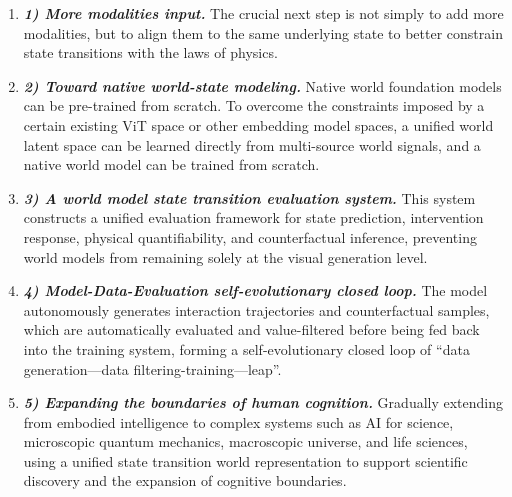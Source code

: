 \vspace{-1ex}
\begin{enumerate}[
    leftmargin=1.35em,
    itemsep=0.35em,
    topsep=0.35em,
    parsep=0em
]
    \item[] \textit{\textbf{1) More modalities input.}} The crucial next step is not simply to add more modalities, but to align them to the same underlying state to better constrain state transitions with the laws of physics.

    
    \item[] \textit{\textbf{2) Toward native world-state modeling.}} Native world foundation models can be pre-trained from scratch. To overcome the constraints imposed by a certain existing ViT space or other embedding model spaces, a unified world latent space can be learned directly from multi-source world signals, and a native world model can be trained from scratch.
    
    \item[] \textit{\textbf{3) A world model state transition evaluation system.}} This system constructs a unified evaluation framework for state prediction, intervention response, physical quantifiability, and counterfactual inference, preventing world models from remaining solely at the visual generation level. 

    \item[] \textit{\textbf{4) Model-Data-Evaluation self-evolutionary closed loop.}} The model autonomously generates interaction trajectories and counterfactual samples, which are automatically evaluated and value-filtered before being fed back into the training system, forming a self-evolutionary closed loop of ``data generation—data filtering-training—leap''.

    \item[] \textit{\textbf{5) Expanding the boundaries of human cognition.}} Gradually extending from embodied intelligence to complex systems such as AI for science, microscopic quantum mechanics, macroscopic universe, and life sciences, using a unified state transition world representation to support scientific discovery and the expansion of cognitive boundaries.
    

\end{enumerate}